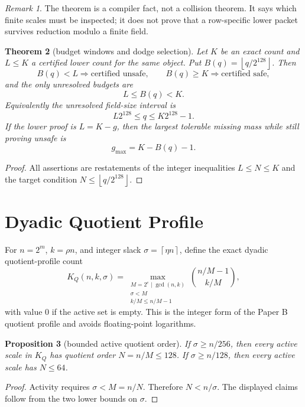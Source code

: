 \documentclass[11pt]{article}
\newtheorem{theorem}{Theorem}[section]
\newtheorem{proposition}[theorem]{Proposition}
\theoremstyle{definition}
\theoremstyle{remark}
\newtheorem{remark}[theorem]{Remark}
\newcommand{\ceil}[1]{\left\lceil #1\right\rceil}
\newcommand{\floor}[1]{\left\lfloor #1\right\rfloor}
\begin{document}
\begin{remark}
The theorem is a compiler fact, not a collision theorem.  It says which finite
scales must be inspected; it does not prove that a row-specific lower packet
survives reduction modulo a finite field.
\end{remark}

\begin{theorem}[budget windows and dodge selection]\label{thm:windows}
Let $K$ be an exact count and $L\le K$ a certified lower count for the same
object.  Put $B(q)=\floor{q/2^{128}}$.  Then
\[
        B(q)<L \Rightarrow \text{certified unsafe},\qquad
        B(q)\ge K \Rightarrow \text{certified safe},
\]
and the only unresolved budgets are
\[
        L\le B(q)<K.
\]
Equivalently the unresolved field-size interval is
\[
        L2^{128}\le q\le K2^{128}-1.
\]
If the lower proof is $L=K-g$, then the largest tolerable missing mass while
still proving unsafe is
\[
        g_{\max}=K-B(q)-1.
\]
\end{theorem}

\begin{proof}
All assertions are restatements of the integer inequalities $L\le N\le K$ and
the target condition $N\le \floor{q/2^{128}}$.
\end{proof}

\section{Dyadic Quotient Profile}

For $n=2^m$, $k=\rho n$, and integer slack
$\sigma=\ceil{\eta n}$, define the exact dyadic quotient-profile count
\[
K_Q(n,k,\sigma)=
\max_{\substack{M=2^e\mid \gcd(n,k)\\ \sigma<M\\ k/M\le n/M-1}}
\binom{n/M-1}{k/M},
\]
with value $0$ if the active set is empty.  This is the integer form of the
Paper B quotient profile and avoids floating-point logarithms.

\begin{proposition}[bounded active quotient order]\label{prop:qprofile}
If $\sigma\ge n/256$, then every active scale in $K_Q$ has quotient order
$N=n/M\le128$.  If $\sigma\ge n/128$, then every active scale has
$N\le64$.
\end{proposition}

\begin{proof}
Activity requires $\sigma<M=n/N$.  Therefore $N<n/\sigma$.  The displayed
claims follow from the two lower bounds on $\sigma$.
\end{proof}
\end{document}
